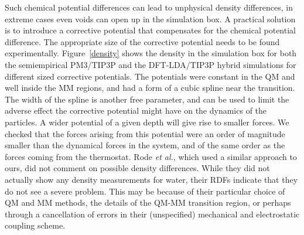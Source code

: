 \documentclass[11pt]{revtex4}
\begin{document}
Such chemical potential differences can lead to unphysical density differences, in extreme cases even voids can open up in the simulation box. A practical solution is to introduce a corrective potential that compensates for the chemical potential difference. The appropriate size of the corrective potential needs to be found experimentally. Figure~\ref{density} shows the density in the simulation box for both the semiempirical PM3/TIP3P and the DFT-LDA/TIP3P hybrid simulations for different sized corrective potentials. The potentials were constant in the QM and well inside the MM regions, and had a form of a cubic spline near the transition. The width of the spline is another free parameter, and can be used to limit the adverse effect the corrective potential might have on the dynamics of the particles. A wider potential of a given depth will give rise to smaller forces. We checked that the forces arising from this potential were an order of magnitude smaller than the dynamical forces in the system, and of the same order as the forces coming from the thermostat.  Rode {\it et al.}, which used a similar approach to ours, did not comment on possible density differences.  While they did not actually show any density measurements for water\cite{xenides_j_chem_phys_2005a,xenides_j_mol_liq_2006a}, their RDFs indicate that they do not see a severe problem.  This may be because of their particular choice of QM and MM methods, the details of the QM-MM transition region, or perhaps through a cancellation of errors in their (unspecified) mechanical and electrostatic coupling scheme.
\end{document}

